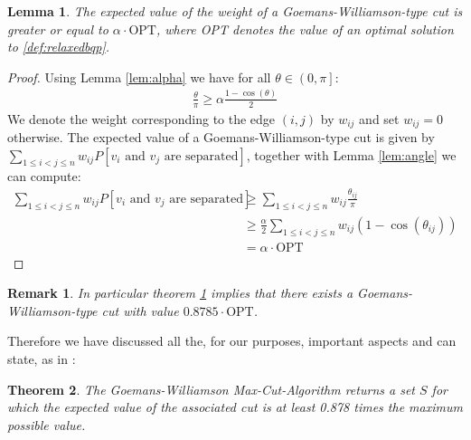 \documentclass[12pt,a4paper]{article}
\theoremstyle{mythm}
\newtheorem{thm}{Theorem}[section]
\newtheorem{lem}[thm]{Lemma}
\newtheorem*{rem}{Remark}
\begin{document}
\begin{lem}
\label{lem:GWalgo} 
The expected value of the weight of a Goemans-Williamson-type cut is greater or equal to $ \alpha \cdot \text{OPT}  $, where OPT denotes the value of an optimal solution to
\ref{def:relaxedbqp}.
\end{lem} 
\begin{proof}
Using Lemma \ref{lem:alpha} we have for all $ \theta \in \left( 0, \pi  \right]   $:
\begin{align*}
\frac{ \theta }{ \pi  } \geq \alpha \frac{ 1 - \cos( \theta )  }{ 2 }  
\end{align*} 
We denote the weight corresponding to the edge $ \left( i,j \right)  $ by $ w _{ ij }  $ and set $ w _{ ij } = 0 $ otherwise.
The expected value of a Goemans-Williamson-type cut is given by \\ $ \sum_{ 1 \leq i < j \leq n    }^{  } w _{ ij }  P \left[ v_i \text{ and } v_j \text{ are separated}  \right]
$, together with Lemma \ref{lem:angle} we can compute:
\begin{align*}
 \sum_{ 1 \leq i < j \leq n    }^{  } w _{ ij }  P \left[ v_i \text{ and } v_j \text{ are separated}  \right]
& \geq \sum_{ 1 \leq i < j \leq n    }^{  } w _{ ij }  \frac{ \theta _{ ij }  }{ \pi } \\
&\geq \frac{ \alpha }{ 2 }  \sum_{ 1 \leq i < j \leq n    }^{  } w _{ ij }  \left( 1 - \cos( \theta _{ ij }  )  \right)  \\
&= \alpha \cdot \text{OPT} 
\end{align*} 
\end{proof}
\begin{rem}
In particular theorem \ref{lem:GWalgo} implies that there exists a Goemans-Williamson-type cut with value $ 0.8785 \cdot \text{OPT} $.
\end{rem} 

Therefore we have discussed all the, for our purposes, important aspects and can state, as in \cite[Theorem 16.12]{Korte2018}:
\begin{thm}
The Goemans-Williamson  Max-Cut-Algorithm returns a set $ S $ for which the expected value of 
the associated cut is at least 0.878 times the maximum possible value.
\end{thm} 
\end{document}
